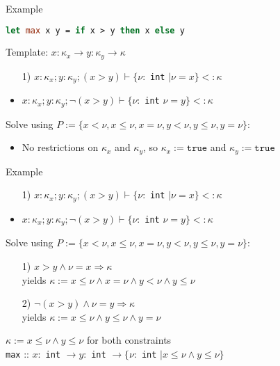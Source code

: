 \documentclass[pdf]{beamer}
\begin{document}
\begin{frame}[fragile]{Example}
  \begin{lstlisting}[language=ML]
let max x y = if x > y then x else y
  \end{lstlisting}
  Template: $x: \kappa_x \rightarrow y: \kappa_y \rightarrow \kappa$
  \begin{itemize}
    \item[1)] $x: \kappa_x; y: \kappa_y; (x > y) \vdash \{\nu:$ \lstinline{int} $\mid \nu = x \} <: \kappa$
    \item[2)] $x: \kappa_x; y: \kappa_y; \neg(x > y) \vdash \{\nu:$ \lstinline{int} $\nu = y \} <: \kappa$
  \end{itemize}
  Solve using $P := \{x < \nu, x \le \nu, x = \nu, y < \nu, y \le \nu, y = \nu\}$:
  \begin{itemize}
    \item No restrictions on $\kappa_x$ and $\kappa_y$, so $\kappa_x := \mathtt{true}$ and $\kappa_y := \mathtt{true}$
  \end{itemize}
\end{frame}

\begin{frame}{Example}
  \begin{itemize}
    \item[1)] $x: \kappa_x; y: \kappa_y; (x > y) \vdash \{\nu:$ \lstinline{int} $\mid \nu = x \} <: \kappa$
    \item[2)] $x: \kappa_x; y: \kappa_y; \neg(x > y) \vdash \{\nu:$ \lstinline{int} $\nu = y \} <: \kappa$
  \end{itemize}
  Solve using $P := \{x < \nu, x \le \nu, x = \nu, y < \nu, y \le \nu, y = \nu\}$:
  \begin{itemize}
    \item[1)] $x > y \land \nu = x \Rightarrow \kappa$\\
      yields $\kappa := x \le \nu \land x = \nu \land y < \nu \land y \le \nu$
    \item[2)] $\neg(x > y) \land \nu = y \Rightarrow \kappa$\\
      yields $\kappa := x \le \nu \land y \le \nu \land y = \nu$
  \end{itemize}
  $\kappa := x \le \nu \land y \le \nu$ for both constraints\\
  \lstinline{max} :: $x:$ \lstinline{int} $\rightarrow y:$ \lstinline{int} $\rightarrow \{\nu:$ \lstinline{int} $\mid x \le \nu \land y \le \nu\}$
\end{frame}
\end{document}
